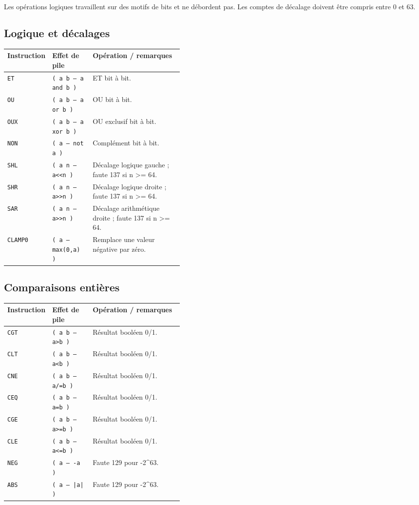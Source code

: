 \documentclass[10pt,a4paper,twoside,openany]{book}
\renewcommand{\arraystretch}{1.12}
\begin{document}
Les opérations logiques travaillent sur des motifs de bits et ne débordent pas. Les comptes de décalage doivent être compris entre 0 et 63.
\subsection{Logique et décalages}
\begin{center}
\renewcommand{\arraystretch}{1.16}
\begin{tabularx}{\linewidth}{@{}p{0.19\linewidth} p{0.23\linewidth} X@{}}
\toprule \textbf{Instruction} & \textbf{Effet de pile} & \textbf{Opération / remarques}\\ \midrule
\texttt{ET} & \texttt{( a b -- a and b )} & ET bit à bit.\\
\texttt{OU} & \texttt{( a b -- a or b )} & OU bit à bit.\\
\texttt{OUX} & \texttt{( a b -- a xor b )} & OU exclusif bit à bit.\\
\texttt{NON} & \texttt{( a -- not a )} & Complément bit à bit.\\
\texttt{SHL} & \texttt{( a n -- a<<n )} & Décalage logique gauche ; faute 137 si n >= 64.\\
\texttt{SHR} & \texttt{( a n -- a>>n )} & Décalage logique droite ; faute 137 si n >= 64.\\
\texttt{SAR} & \texttt{( a n -- a>>n )} & Décalage arithmétique droite ; faute 137 si n >= 64.\\
\texttt{CLAMP0} & \texttt{( a -- max(0,a) )} & Remplace une valeur négative par zéro.\\
\bottomrule
\end{tabularx}
\end{center}
\subsection{Comparaisons entières}
\begin{center}
\renewcommand{\arraystretch}{1.16}
\begin{tabularx}{\linewidth}{@{}p{0.19\linewidth} p{0.23\linewidth} X@{}}
\toprule \textbf{Instruction} & \textbf{Effet de pile} & \textbf{Opération / remarques}\\ \midrule
\texttt{CGT} & \texttt{( a b -- a>b )} & Résultat booléen 0/1.\\
\texttt{CLT} & \texttt{( a b -- a<b )} & Résultat booléen 0/1.\\
\texttt{CNE} & \texttt{( a b -- a/=b )} & Résultat booléen 0/1.\\
\texttt{CEQ} & \texttt{( a b -- a=b )} & Résultat booléen 0/1.\\
\texttt{CGE} & \texttt{( a b -- a>=b )} & Résultat booléen 0/1.\\
\texttt{CLE} & \texttt{( a b -- a<=b )} & Résultat booléen 0/1.\\
\texttt{NEG} & \texttt{( a -- -a )} & Faute 129 pour -2\textasciicircum{}63.\\
\texttt{ABS} & \texttt{( a -- |a| )} & Faute 129 pour -2\textasciicircum{}63.\\
\bottomrule
\end{tabularx}
\end{center}
\end{document}
